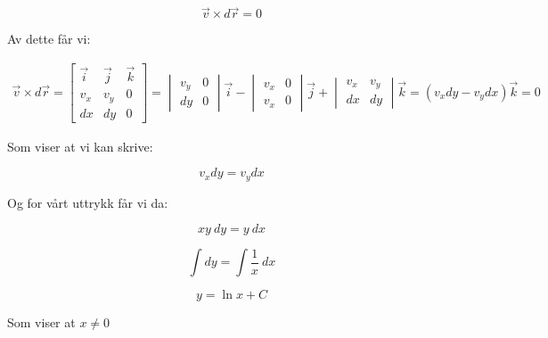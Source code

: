 \documentclass{article}
\begin{document}
\begin{equation*}
\vec{v} \times d\vec{r} = 0
\end{equation*}

\begin{flushleft}
Av dette får vi:
\end{flushleft}

\begin{align*}
\vec{v} \times d\vec{r} = \begin{bmatrix}
\vec{i} & \vec{j} & \vec{k} \\ v_x & v_y & 0 \\ dx & dy & 0 \end{bmatrix} 
 = \begin{vmatrix}v_y & 0 \\ dy & 0\end{vmatrix}\vec{i} - 
 \begin{vmatrix}v_x & 0 \\ v_x & 0\end{vmatrix}\vec{j} + 
 \begin{vmatrix}v_x & v_y \\ dx & dy\end{vmatrix}\vec{k} = (v_xdy - v_ydx)\vec{k} = 0
\end{align*}

\bigskip

\begin{flushleft}
Som viser at vi kan skrive:
\end{flushleft}

\begin{equation*}
v_xdy = v_ydx
\end{equation*}

\begin{flushleft}
Og for vårt uttrykk får vi da:
\end{flushleft}

\begin{equation*}
xy \ dy = y \ dx
\end{equation*}

\begin{equation*}
\int dy = \int \frac{1}{x} \ dx
\end{equation*}

\begin{equation*}
y = \ln{x} + C
\end{equation*}

\begin{flushleft}
Som viser at \(x \neq 0 \)
\end{flushleft}
\end{document}
